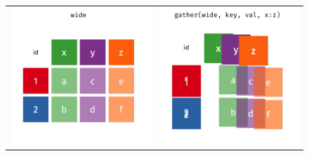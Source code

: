 \newpage 
\begin{figure}[H]
    \begin{tabular}{cc}
     \includegraphics[scale = 0.25]{Masters-Thesis/img/tidyew2ls1.png} & \includegraphics[scale = 0.25]{Masters-Thesis/img/tidyew2ls2.png} \\

\end{tabular}
\end{figure}
